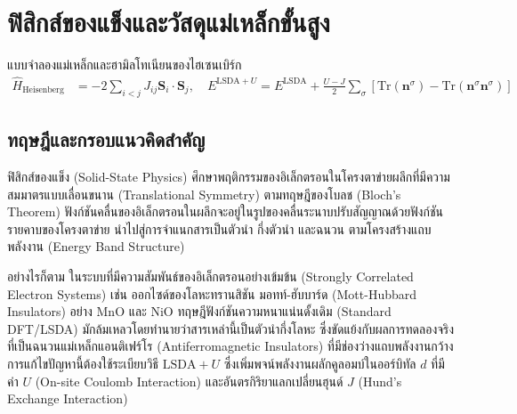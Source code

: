 
\chapter{ฟิสิกส์ของแข็งและวัสดุแม่เหล็กขั้นสูง}
\label{ch:chapter07}


\vspace{0.4cm}

\begin{equationsbox}{แบบจำลองแม่เหล็กและฮามิลโทเนียนของไฮเซนเบิร์ก}
\begin{align}
\hat{H}_{\text{Heisenberg}} &= -2\sum_{i < j} J_{ij} \mathbf{S}_i \cdot \mathbf{S}_j, \quad E^{\text{LSDA}+U} = E^{\text{LSDA}} + \frac{U - J}{2}\sum_{\sigma}\left[\text{Tr}(\mathbf{n}^\sigma) - \text{Tr}(\mathbf{n}^\sigma \mathbf{n}^\sigma)\right]
\end{align}
\end{equationsbox}

\section{ทฤษฎีและกรอบแนวคิดสำคัญ}

ฟิสิกส์ของแข็ง (Solid-State Physics) ศึกษาพฤติกรรมของอิเล็กตรอนในโครงตาข่ายผลึกที่มีความสมมาตรแบบเลื่อนขนาน (Translational Symmetry) ตามทฤษฎีของโบลช (Bloch's Theorem) ฟังก์ชันคลื่นของอิเล็กตรอนในผลึกจะอยู่ในรูปของคลื่นระนาบปรับสัญญาณด้วยฟังก์ชันรายคาบของโครงตาข่าย นำไปสู่การจำแนกสารเป็นตัวนำ กึ่งตัวนำ และฉนวน ตามโครงสร้างแถบพลังงาน (Energy Band Structure)

อย่างไรก็ตาม ในระบบที่มีความสัมพันธ์ของอิเล็กตรอนอย่างเข้มข้น (Strongly Correlated Electron Systems) เช่น ออกไซด์ของโลหะทรานสิชัน มอทท์-ฮับบาร์ด (Mott-Hubbard Insulators) อย่าง $\text{MnO}$ และ $\text{NiO}$ ทฤษฎีฟังก์ชันความหนาแน่นดั้งเดิม (Standard DFT/LSDA) มักล้มเหลวโดยทำนายว่าสารเหล่านี้เป็นตัวนำกึ่งโลหะ ซึ่งขัดแย้งกับผลการทดลองจริงที่เป็นฉนวนแม่เหล็กแอนติเฟร์โร (Antiferromagnetic Insulators) ที่มีช่องว่างแถบพลังงานกว้าง การแก้ไขปัญหานี้ต้องใช้ระเบียบวิธี $\text{LSDA}+U$ ซึ่งเพิ่มพจน์พลังงานผลักคูลอมบ์ในออร์บิทัล $d$ ที่มีค่า $U$ (On-site Coulomb Interaction) และอันตรกิริยาแลกเปลี่ยนฮุนด์ $J$ (Hund's Exchange Interaction)

